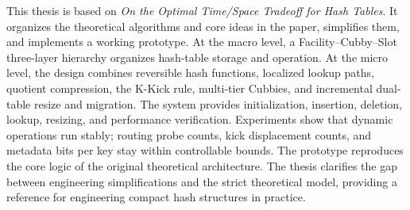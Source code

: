 \documentclass[
    type = bachelor,
    decl-page,  %
    oneside,                %
  ]{njuthesis}
\begin{document}

\maketitle

\raggedbottom

\begin{abstract}

本论文以《On the Optimal Time/Space Trade off for Hash Tables》为实验方向，系统整理文中提及的理论算法及核心思想，然后加以简化并落实到实际当中，从宏观架构层面，搭建了 Facility - Cubby - Slot 三层存储体系，从而达成高效地组织和运作哈希表的目的；微观机制层面，融合了可逆哈希函数，局部查询路径，商压缩，K - Kick 规则，多层级Cubby 以及双表渐进式扩缩容迁移等主要技术。 落地的哈希系统包含初始化，插入，删除，查询，扩容以及性能指标验证等完整的操作，实验结果表明，该系统可以稳定执行各类动态操作，其路由访问步数，元素被踢出的移动次数以及元数据编码位数等关键指标均处于可控制范围内，能够精准再现原始理论架构的核心逻辑，而且，本文明确了工程简化达成与严格理论模型之间的差异界限，给类似紧凑哈希结构的工程化重现及其在实际场景中的应用赋予了有价值的参考。

\end{abstract}

\begin{abstract*}

 This thesis is based on \textit{On the Optimal Time/Space Tradeoff for Hash Tables}. It organizes the theoretical algorithms and core ideas in the paper, simplifies them, and implements a working prototype. At the macro level, a Facility--Cubby--Slot three-layer hierarchy organizes hash-table storage and operation. At the micro level, the design combines reversible hash functions, localized lookup paths, quotient compression, the K-Kick rule, multi-tier Cubbies, and incremental dual-table resize and migration. The system provides initialization, insertion, deletion, lookup, resizing, and performance verification. Experiments show that dynamic operations run stably; routing probe counts, kick displacement counts, and metadata bits per key stay within controllable bounds. The prototype reproduces the core logic of the original theoretical architecture. The thesis clarifies the gap between engineering simplifications and the strict theoretical model, providing a reference for engineering compact hash structures in practice.

\end{abstract*}
\end{document}

